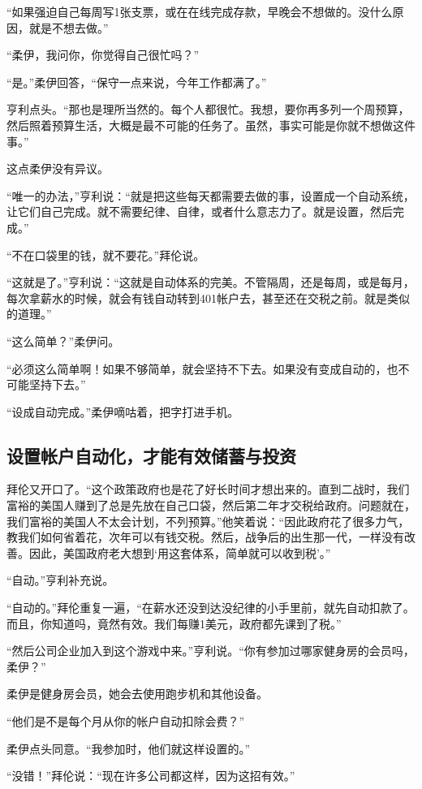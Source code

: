 “如果强迫自己每周写1张支票，或在在线完成存款，早晚会不想做的。没什么原因，就是不想去做。”

“柔伊，我问你，你觉得自己很忙吗？”

“是。”柔伊回答，“保守一点来说，今年工作都满了。”

亨利点头。“那也是理所当然的。每个人都很忙。我想，要你再多列一个周预算，然后照着预算生活，大概是最不可能的任务了。虽然，事实可能是你就不想做这件事。”

这点柔伊没有异议。

“唯一的办法，”亨利说：“就是把这些每天都需要去做的事，设置成一个自动系统，让它们自己完成。就不需要纪律、自律，或者什么意志力了。就是设置，然后完成。”

“不在口袋里的钱，就不要花。”拜伦说。

“这就是了。”亨利说：“这就是自动体系的完美。不管隔周，还是每周，或是每月，每次拿薪水的时候，就会有钱自动转到401帐户去，甚至还在交税之前。就是类似的道理。”

“这么简单？”柔伊问。

“必须这么简单啊！如果不够简单，就会坚持不下去。如果没有变成自动的，也不可能坚持下去。”

“设成自动完成。”柔伊嘀咕着，把字打进手机。

\subsection{设置帐户自动化，才能有效储蓄与投资}

拜伦又开口了。“这个政策政府也是花了好长时间才想出来的。直到二战时，我们富裕的美国人赚到了总是先放在自己口袋，然后第二年才交税给政府。问题就在，我们富裕的美国人不太会计划，不列预算。”他笑着说：“因此政府花了很多力气，教我们如何省着花，次年可以有钱交税。然后，战争后的出生那一代，一样没有改善。因此，美国政府老大想到‘用这套体系，简单就可以收到税’。”

“自动。”亨利补充说。

“自动的。”拜伦重复一遍，“在薪水还没到达没纪律的小手里前，就先自动扣款了。而且，你知道吗，竟然有效。我们每赚1美元，政府都先课到了税。”

“然后公司企业加入到这个游戏中来。”亨利说。“你有参加过哪家健身房的会员吗，柔伊？”

柔伊是健身房会员，她会去使用跑步机和其他设备。

“他们是不是每个月从你的帐户自动扣除会费？”

柔伊点头同意。“我参加时，他们就这样设置的。”

“没错！”拜伦说：“现在许多公司都这样，因为这招有效。”

